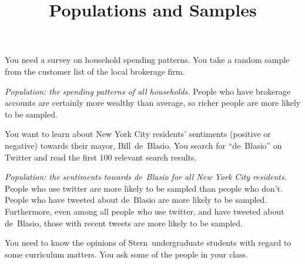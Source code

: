 \documentclass[11pt]{exam}
\title{Populations  and Samples}
\begin{document}
\begin{questions}



\question You need a survey on household spending patterns.  You take a random
sample from the customer list of the local brokerage firm.

\begin{solution}
\textit{Population: the spending patterns of all households.}
People who have brokerage accounts are certainly more wealthy
than average, so richer people are more likely to be sampled.
\end{solution}




\question You want to learn about New York City residents' sentiments (positive
or negative) towards their mayor, Bill~de~Blasio.  You search for
``de~Blasio'' on Twitter and read the first 100 relevant search results.

\begin{solution}
\textit{Population: the sentiments towards de~Blasio for all New York City
residents.}   People who use twitter are more likely to be sampled than people
who don't.  People who have tweeted about de~Blasio are more likely to be
sampled.  Furthermore, even among all people who use twitter, and have tweeted about
de~Blasio, those with recent tweets are more likely to be sampled.
\end{solution}



\question You need to know the opinions of Stern~undergraduate students with regard to
some curriculum matters.  You ask some of the people in your class.


\end{questions}
\end{document}
